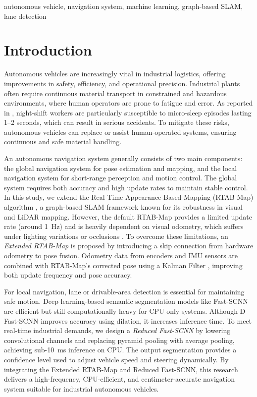 \documentclass[conference, a4paper]{IEEEtran}[2015/08/26]
\begin{document}
\begin{IEEEkeywords}
autonomous vehicle, navigation system, machine learning, graph-based SLAM, lane detection
\end{IEEEkeywords}

\section{Introduction}
Autonomous vehicles are increasingly vital in industrial logistics, offering improvements in safety, efficiency, and operational precision. Industrial plants often require continuous material transport in constrained and hazardous environments, where human operators are prone to fatigue and error. As reported in \cite{ref_sleep}, night-shift workers are particularly susceptible to micro-sleep episodes lasting 1--2 seconds, which can result in serious accidents. To mitigate these risks, autonomous vehicles can replace or assist human-operated systems, ensuring continuous and safe material handling.

\par
An autonomous navigation system generally consists of two main components: the global navigation system for pose estimation and mapping, and the local navigation system for short-range perception and motion control. The global system requires both accuracy and high update rates to maintain stable control. In this study, we extend the Real-Time Appearance-Based Mapping (RTAB-Map) algorithm \cite{ref_rtabmap}, a graph-based SLAM framework known for its robustness in visual and LiDAR mapping. However, the default RTAB-Map provides a limited update rate (around 1~Hz) and is heavily dependent on visual odometry, which suffers under lighting variations or occlusions \cite{ref_vslam}. To overcome these limitations, an \textit{Extended RTAB-Map} is proposed by introducing a skip connection from hardware odometry to pose fusion. Odometry data from encoders and IMU sensors are combined with RTAB-Map’s corrected pose using a Kalman Filter \cite{ref_mas_marin}, improving both update frequency and pose accuracy.

\par
For local navigation, lane or drivable-area detection is essential for maintaining safe motion. Deep learning-based semantic segmentation models like Fast-SCNN \cite{ref_fast_scnn} are efficient but still computationally heavy for CPU-only systems. Although D-Fast-SCNN \cite{ref_dfast_scnn} improves accuracy using dilation, it increases inference time. To meet real-time industrial demands, we design a \textit{Reduced Fast-SCNN} by lowering convolutional channels and replacing pyramid pooling with average pooling, achieving sub-10~ms inference on CPU. The output segmentation provides a confidence level used to adjust vehicle speed and steering dynamically. By integrating the Extended RTAB-Map and Reduced Fast-SCNN, this research delivers a high-frequency, CPU-efficient, and centimeter-accurate navigation system suitable for industrial autonomous vehicles.
\end{document}
